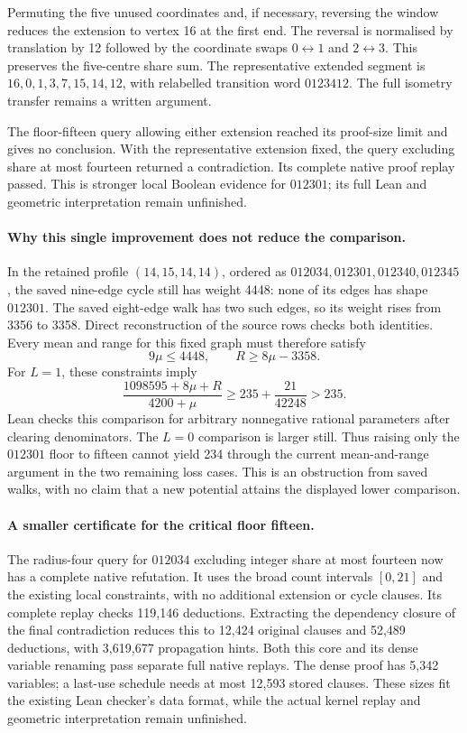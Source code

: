 \documentclass[11pt,a4paper]{article}
\theoremstyle{definition}
\theoremstyle{remark}
\begin{document}
Permuting the five unused coordinates and, if necessary, reversing the
window reduces the extension to vertex 16 at the first end. The reversal
is normalised by translation by 12 followed by the coordinate swaps
$0\leftrightarrow1$ and $2\leftrightarrow3$. This preserves the five-centre
share sum. The representative extended segment is
$16,0,1,3,7,15,14,12$, with relabelled transition word $0123412$.
The full isometry transfer remains a written argument.

The floor-fifteen query allowing either extension reached its proof-size
limit and gives no conclusion. With the representative extension fixed,
the query excluding share at most fourteen returned a contradiction.
Its complete native proof replay passed. This is stronger local Boolean
evidence for $012301$; its full Lean and geometric interpretation remain
unfinished.

\paragraph{Why this single improvement does not reduce the comparison.}
In the retained profile $(14,15,14,14)$, ordered as
$012034,012301,012340,012345$, the saved nine-edge cycle still has weight
4448: none of its edges has shape $012301$. The saved eight-edge walk
has two such edges, so its weight rises from 3356 to 3358. Direct
reconstruction of the source rows checks both identities. Every mean
and range for this fixed graph must therefore satisfy
\[
9\mu\le4448,\qquad R\ge8\mu-3358.
\]
For $L=1$, these constraints imply
\[
\frac{1098595+8\mu+R}{4200+\mu}
\ge235+\frac{21}{42248}>235.
\]
Lean checks this comparison for arbitrary nonnegative rational parameters
after clearing denominators. The $L=0$ comparison is larger still.
Thus raising only the $012301$ floor to fifteen cannot yield 234 through
the current mean-and-range argument in the two remaining loss cases.
This is an obstruction from saved walks, with no claim that a new
potential attains the displayed lower comparison.

\paragraph{A smaller certificate for the critical floor fifteen.}
The radius-four query for $012034$ excluding integer share at most fourteen
now has a complete native refutation. It uses the broad count intervals
$[0,21]$ and the existing local constraints, with no additional extension
or cycle clauses. Its complete replay checks 119,146 deductions.
Extracting the dependency closure of the final contradiction reduces this
to 12,424 original clauses and 52,489 deductions, with 3,619,677 propagation
hints. Both this core and its dense variable renaming pass separate full
native replays. The dense proof has 5,342 variables; a last-use schedule
needs at most 12,593 stored clauses. These sizes fit the existing Lean
checker's data format, while the actual kernel replay and geometric
interpretation remain unfinished.
\end{document}
